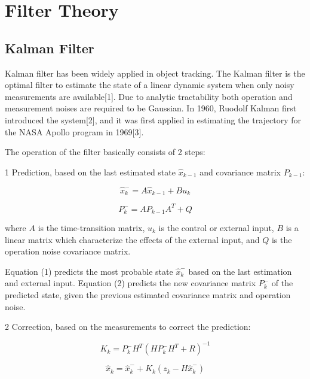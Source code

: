 \documentclass[10pt,twocolumn,letterpaper]{article}
\begin{document}
\section{Filter Theory}

\subsection{Kalman Filter}

Kalman filter has been widely applied in object tracking. The Kalman filter is the optimal filter to estimate the state of a linear dynamic system when only noisy measurements are available[1]. Due to analytic tractability both operation and measurement noises are required to be Gaussian. In 1960, Ruodolf Kalman first introduced the system[2], and it was first applied in estimating the trajectory for the NASA Apollo program in 1969[3].

The operation of the filter basically consists of 2 steps:

1 Prediction, based on the last estimated state $\hat{x}_{k-1}$ and covariance matrix $P_{k-1}$:

\begin{equation}
\hat{x}_k^-=A\hat{x}_{k-1}+Bu_k
\end{equation}

\begin{equation}
P_k^-=AP_{k-1}A^T+Q
\end{equation}

where $A$ is the time-transition matrix,  $u_k$ is the control or external input, $B$ is a linear matrix which characterize the effects of the external input, and $Q$ is the operation noise covariance matrix.

Equation (1) predicts the most probable state $\hat{x}_k^-$ based on the last estimation and external input. Equation (2) predicts the new covariance matrix $P_k^-$ of the predicted state, given the previous estimated covariance matrix and operation noise.

2 Correction, based on the measurements to correct the prediction:

\begin{equation}
K_k=P_k^-H^T(HP_k^-H^T+R)^{-1}
\end{equation}

\begin{equation}
\hat{x}_k=\hat{x}_k^-+K_k(z_k-H\hat{x}_k^-)
\end{equation}
\end{document}
